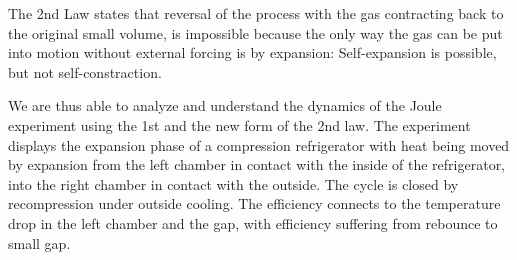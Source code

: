 




The 2nd Law states that reversal of 
the process with the gas contracting back to the original small volume,
is impossible because the only way the gas can be put into motion without external forcing is 
by expansion: Self-expansion is possible, but not self-constraction. 

We are thus able to analyze and understand the dynamics of the Joule experiment using the 1st and
the new form of the 2nd law. The experiment displays the expansion phase of a compression refrigerator
with heat being moved by expansion from the left chamber in contact with the inside of the refrigerator, 
into the right chamber in contact with the outside. The cycle is closed by recompression under outside cooling. 
The efficiency connects to the temperature drop in the left chamber and the gap, with efficiency suffering from
rebounce to small gap.  

